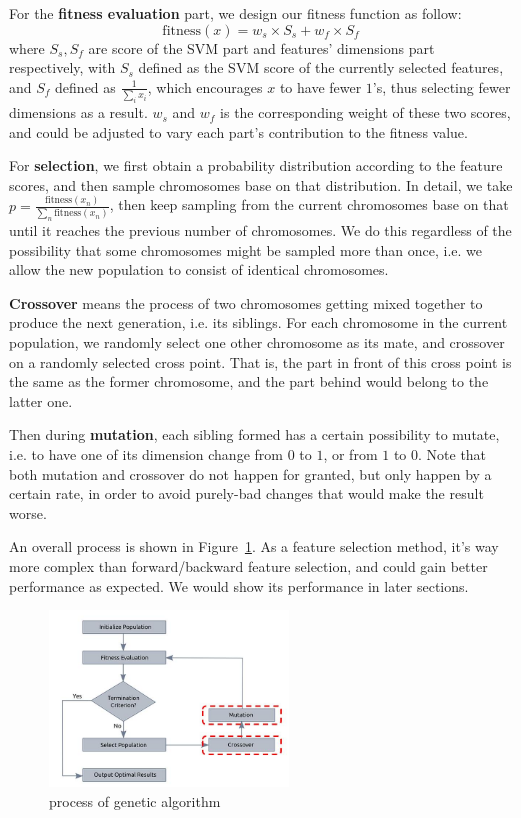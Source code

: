 \documentclass[journal]{IEEEtran}
\begin{document}
For the \textbf{fitness evaluation} part, we design our fitness function as follow:
$$
\mathrm{fitness}(x) = w_s\times S_s + w_f\times S_f
$$
where $S_s, S_f$ are score of the SVM part and features' dimensions part respectively, with $S_s$ defined as the SVM score of the currently selected features, and $S_f$ defined as $\frac{1}{\sum_i x_i}$, which encourages $x$ to have fewer $1$'s, thus selecting fewer dimensions as a result. $w_s$ and $w_f$ is the corresponding weight of these two scores, and could be adjusted to vary each part's contribution to the fitness value.

For \textbf{selection}, we first obtain a probability distribution according to the feature scores, and then sample chromosomes base on that distribution. In detail, we take $p = \frac{\mathrm{fitness}(x_n)}{\sum_n \mathrm{fitness}(x_n)}$, then keep sampling from the current chromosomes base on that until it reaches the previous number of chromosomes. We do this regardless of the possibility that some chromosomes might be sampled more than once, i.e. we allow the new population to consist of identical chromosomes.

\textbf{Crossover} means the process of two chromosomes getting mixed together to produce the next generation, i.e. its siblings. For each chromosome in the current population, we randomly select one other chromosome as its mate, and crossover on a randomly selected cross point. That is, the part in front of this cross point is the same as the former chromosome, and the part behind would belong to the latter one.

Then during \textbf{mutation}, each sibling formed has a certain possibility to mutate, i.e. to have one of its dimension change from $0$ to $1$, or from $1$ to $0$. Note that both mutation and crossover do not happen for granted, but only happen by a certain rate, in order to avoid purely-bad changes that would make the result worse.

An overall process is shown in Figure~\ref{fig:1}. As a feature selection method, it's way more complex than forward/backward feature selection, and could gain better performance as expected. We would show its performance in later sections. 
\begin{figure}[htpb]
  \centering
  \includegraphics[width=2.5in]{genetic_alg.jpg}
  \caption{process of genetic algorithm}
  \label{fig:1}
  \vspace{-3mm}
\end{figure}
\end{document}
